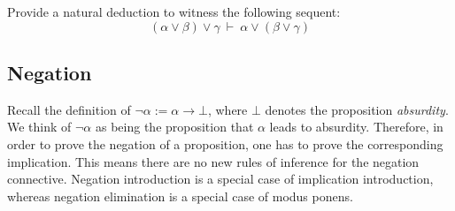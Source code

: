 \documentclass{book}
\begin{document}
    \begin{eg}

        Provide a natural deduction to witness the following sequent: $$(\alpha \lor \beta) \lor \gamma \ \vdash \ \alpha \lor (\beta \lor \gamma) $$

        
    \end{eg}

    \newpage
    \subsection{Negation}

    Recall the definition of $\lnot \alpha := \alpha \to \bot$, where $\bot$ denotes the proposition \emph{absurdity}. We think of $\lnot \alpha$ as being the proposition that $\alpha$ leads to absurdity. Therefore, in order to prove the negation of a proposition, one has to prove the corresponding implication. This means there are no new rules of inference for the negation connective. Negation introduction is a special case of implication introduction, whereas negation elimination is a special case of modus ponens. 
\end{document}
